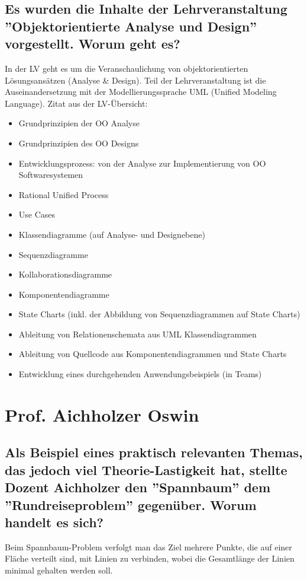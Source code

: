 \subsection{Es wurden die Inhalte der Lehrveranstaltung
    ''Objektorientierte Analyse und Design'' vorgestellt. Worum geht es?}

In der LV geht es um die Veranschaulichung von objektorientierten
Lösungsansätzen (Analyse \& Design). Teil der Lehrveranstaltung ist die
Auseinandersetzung mit der Modellierungssprache UML (Unified Modeling
Language). Zitat aus der LV-Übersicht:

\begin{itemize}
  \item Grundprinzipien der OO Analyse
  \item Grundprinzipien des OO Designs
  \item Entwicklungsprozess: von der Analyse zur Implementierung von OO
Softwaresystemen
  \item Rational Unified Process
  \item Use Cases
  \item Klassendiagramme (auf Analyse- und Designebene)
  \item Sequenzdiagramme
  \item Kollaborationsdiagramme
  \item Komponentendiagramme
  \item State Charts (inkl. der Abbildung von Sequenzdiagrammen auf State Charts)
  \item Ableitung von Relationenschemata aus UML Klassendiagrammen
  \item Ableitung von Quellcode aus Komponentendiagrammen und State Charts
  \item Entwicklung eines durchgehenden Anwendungsbeispiels (in Teams) 
\end{itemize}

\section{Prof. Aichholzer Oswin}

\subsection{Als Beispiel eines praktisch relevanten Themas, das jedoch
    viel Theorie-Lastigkeit hat, stellte Dozent Aichholzer den
    ''Spannbaum'' dem ''Rundreiseproblem'' gegenüber.
    Worum handelt es sich?}

Beim Spannbaum-Problem verfolgt man das Ziel mehrere Punkte, die auf
einer Fläche verteilt sind, mit Linien zu verbinden, wobei die
Gesamtlänge der Linien minimal gehalten werden soll.

